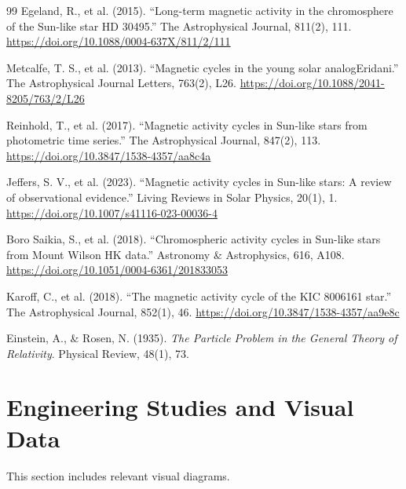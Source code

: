 \documentclass[12pt]{article}
\begin{document}
\begin{thebibliography}{99}
 Egeland, R., et al. (2015).
``Long-term magnetic activity in the chromosphere of the Sun-like star HD 30495.''
The Astrophysical Journal, 811(2), 111.
\url{https://doi.org/10.1088/0004-637X/811/2/111}

Metcalfe, T. S., et al. (2013).
``Magnetic cycles in the young solar analog\allowbreak Eridani.''
The Astrophysical Journal Letters, 763(2), L26.
\url{https://doi.org/10.1088/2041-8205/763/2/L26}

Reinhold, T., et al. (2017).
``Magnetic activity cycles in Sun-like stars from photometric time series.''
The Astrophysical Journal, 847(2), 113.
\url{https://doi.org/10.3847/1538-4357/aa8c4a}

Jeffers, S. V., et al. (2023).
``Magnetic activity cycles in Sun-like stars: A review of observational evidence.''
Living Reviews in Solar Physics, 20(1), 1.
\url{https://doi.org/10.1007/s41116-023-00036-4}

Boro Saikia, S., et al. (2018).
``Chromospheric activity cycles in Sun-like stars from Mount Wilson HK data.''
Astronomy \& Astrophysics, 616, A108.
\url{https://doi.org/10.1051/0004-6361/201833053}

Karoff, C., et al. (2018).
``The magnetic activity cycle of the KIC 8006161 star.''
The Astrophysical Journal, 852(1), 46.
\url{https://doi.org/10.3847/1538-4357/aa9e8c}

Einstein, A., \& Rosen, N. (1935).
\textit{The Particle Problem in the General Theory of Relativity}.
Physical Review, 48(1), 73.

\end{thebibliography}
\newpage
\section{Engineering Studies and Visual Data}
This section includes relevant visual diagrams.

\end{document}

